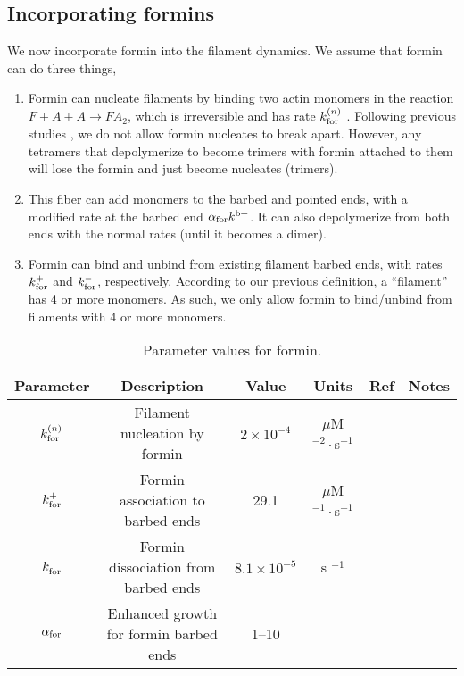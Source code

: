 \documentclass[11pt]{article}
\begin{document}
\subsection{Incorporating formins}
We now incorporate formin into the filament dynamics. We assume that formin can do three things,
\begin{enumerate}
\item Formin can nucleate filaments by binding two actin monomers in the reaction $F+A+A \rightarrow FA_2$, which is irreversible and has rate $k_\text{for}^{(n)}$ \cite{paul2008role, zweifel2021nucleation}. Following previous studies \cite{paul2008role, zweifel2021nucleation}, we do not allow formin nucleates to break apart. However, any tetramers that depolymerize to become trimers with formin attached to them will lose the formin and just become nucleates (trimers).
\item This fiber can add monomers to the barbed and pointed ends, with a modified rate at the barbed end $\alpha_\text{for} k^\text{b+}$. It can also depolymerize from both ends with the normal rates (until it becomes a dimer).
\item Formin can bind and unbind from existing filament barbed ends, with rates $k_\text{for}^+$ and $k_\text{for}^-$, respectively. According to our previous definition, a ``filament'' has 4 or more monomers. As such, we only allow formin to bind/unbind from filaments with 4 or more monomers.
\end{enumerate}


\begin{table}
\begin{center}
\begin{tabular}{|c|c|c|c|c|c|}\hline
Parameter & Description & Value & Units & Ref & Notes \\ \hline
$k_\text{for}^{(n)}$ & Filament nucleation by formin & $2 \times 10^{-4}$ & $\mu$M$^{-2}\cdot$s$^{-1}$& \cite[Tab.~S1]{paul2008role} & \\ 
$k_\text{for}^+$ & Formin association to barbed ends& 29.1 & $\mu$M$^{-1} \cdot $s$^{-1}$ & \cite{shekhar2015formin}& \\
$k_\text{for}^-$ & Formin dissociation from barbed ends& $8.1 \times 10^{-5}$ & s $^{-1}$ & \cite{shekhar2015formin}& \\
$\alpha_\text{for}$ & Enhanced growth for formin barbed ends & 1--10 & & &\\ \hline
\end{tabular}
\caption{\label{tab:paramsF} Parameter values for formin.}
\end{center}
\end{table}
\end{document}
